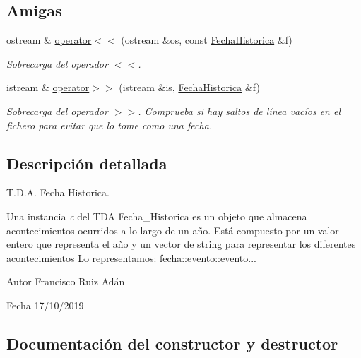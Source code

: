 \subsection*{Amigas}
\begin{DoxyCompactItemize}
\item 
ostream \& \hyperlink{classFechaHistorica_ae7ffc75da1b9b42da839968d57c0dc9c}{operator$<$$<$} (ostream \&os, const \hyperlink{classFechaHistorica}{Fecha\+Historica} \&f)
\begin{DoxyCompactList}\small\item\em Sobrecarga del operador $<$$<$. \end{DoxyCompactList}\item 
istream \& \hyperlink{classFechaHistorica_a25a93d162aadd3c52aa1f3d1831e3d75}{operator$>$$>$} (istream \&is, \hyperlink{classFechaHistorica}{Fecha\+Historica} \&f)
\begin{DoxyCompactList}\small\item\em Sobrecarga del operador $>$$>$. Comprueba si hay saltos de línea vacíos en el fichero para evitar que lo tome como una fecha. \end{DoxyCompactList}\end{DoxyCompactItemize}


\subsection{Descripción detallada}
T.\+D.\+A. Fecha Historica. 

Una instancia {\itshape c} del T\+DA {\ttfamily Fecha\+\_\+\+Historica} es un objeto que almacena acontecimientos ocurridos a lo largo de un año. Está compuesto por un valor entero que representa el año y un vector de string para representar los diferentes acontecimientos Lo representamos\+: fecha\+::evento\+::evento...

\begin{DoxyAuthor}{Autor}
Francisco Ruiz Adán 
\end{DoxyAuthor}
\begin{DoxyDate}{Fecha}
17/10/2019 
\end{DoxyDate}


\subsection{Documentación del constructor y destructor}
\mbox{\label{classFechaHistorica_a35baa09e365240e567049a7e33a7c209}} 
